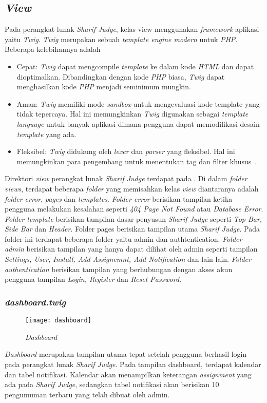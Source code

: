 \subsection{\textit{View}}
Pada perangkat lunak \textit{\textit{Sharif Judge}}, kelas view menggunakan \textit{framework} aplikasi yaitu \textit{Twig}. \textit{Twig} merupakan sebuah \textit{template engine modern} untuk \textit{PHP}. Beberapa kelebihannya adalah
\begin{itemize}
	\item Cepat: \textit{Twig} dapat mengcompile \textit{template} ke dalam kode \textit{HTML} dan dapat dioptimalkan. Dibandingkan dengan kode \textit{PHP} biasa, \textit{Twig} dapat menghasilkan kode \textit{PHP} menjadi seminimum mungkin.
	\item Aman: \textit{Twig} memiliki mode \textit{sandbox} untuk mengevaluasi kode template yang tidak tepercaya. Hal ini memungkinkan \textit{Twig} digunakan sebagai \textit{template language} untuk banyak aplikasi dimana pengguna dapat memodifikasi desain \textit{template} yang ada.
	\item Fleksibel: \textit{Twig} didukung oleh \textit{lexer} dan \textit{parser} yang fleksibel. Hal ini memungkinkan para pengembang untuk menentukan tag dan filter khusus~\cite{fabien:09:twig}.
\end{itemize}

Direktori \textit{view} perangkat lunak \textit{Sharif Judge} terdapat pada . Di dalam \textit{folder views}, terdapat beberapa \textit{folder} yang memisahkan kelas \textit{view} diantaranya adalah \textit{folder error}, \textit{pages} dan \textit{templates}. \textit{Folder error} berisikan tampilan ketika pengguna melakukan kesalahan seperti\textit{ 404 Page Not Found} atau \textit{Database Error}. \textit{Folder template} berisikan tampilan dasar penyusun \textit{Sharif Judge} seperti \textit{Top Bar, Side Bar} dan \textit{Header}. Folder pages berisikan tampilan utama \textit{\textit{Sharif Judge}}. Pada folder ini terdapat beberapa folder yaitu admin dan authtentication. \textit{Folder admin} berisikan tampilan yang hanya dapat dilihat oleh admin seperti tampilan \textit{Settings, User, Install, Add Assignemnt, Add Notification} dan lain-lain. \textit{Folder authentication} berisikan tampilan yang berhubungan dengan akses akun pengguna tampilan \textit{Login, Register} dan \textit{Reset Password}.

\subsubsection{\textit{dashboard.twig}}
\begin{figure}[H]
	\centering  
	\texttt{[image: dashboard]}  
	\caption[\textit{Dashboard}]{\textit{Dashboard}} 
	\label{fig:dashboard} 
\end{figure} 
\textit{Dashboard} merupakan tampilan utama tepat setelah pengguna berhasil login pada perangkat lunak \textit{Sharif Judge}. Pada tampilan dashboard, terdapat kalendar dan tabel notifikasi. Kalendar akan menampilkan keterangan \textit{assignment} yang ada pada \textit{Sharif Judge}, sedangkan tabel notifikasi akan berisikan 10 pengumuman terbaru yang telah dibuat oleh admin.

